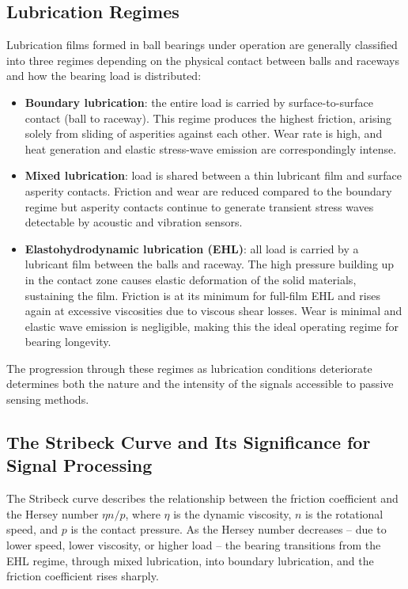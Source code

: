\subsection{Lubrication Regimes}
\label{subsec:lubrication_regimes}
Lubrication films formed in ball bearings under operation are generally classified into three regimes depending on the physical contact between balls and raceways and how the bearing load is distributed:
\begin{itemize}
    \item \textbf{Boundary lubrication}: the entire load is carried by surface-to-surface contact (ball to raceway). This regime produces the highest friction, arising solely from sliding of asperities against each other. Wear rate is high, and heat generation and elastic stress-wave emission are correspondingly intense.
    \item \textbf{Mixed lubrication}: load is shared between a thin lubricant film and surface asperity contacts. Friction and wear are reduced compared to the boundary regime but asperity contacts continue to generate transient stress waves detectable by acoustic and vibration sensors.
    \item \textbf{Elastohydrodynamic lubrication (EHL)}: all load is carried by a lubricant film between the balls and raceway. The high pressure building up in the contact zone causes elastic deformation of the solid materials, sustaining the film. Friction is at its minimum for full-film EHL and rises again at excessive viscosities due to viscous shear losses. Wear is minimal and elastic wave emission is negligible, making this the ideal operating regime for bearing longevity.
\end{itemize}
The progression through these regimes as lubrication conditions deteriorate determines both the nature and the intensity of the signals accessible to passive sensing methods.

\subsection{The Stribeck Curve and Its Significance for Signal Processing}
\label{subsec:stribeck}
 The Stribeck curve describes the relationship between the friction coefficient and the Hersey number $\eta n / p$, where $\eta$ is the dynamic viscosity, $n$ is the rotational speed, and $p$ is the contact pressure. As the Hersey number decreases -- due to lower speed, lower viscosity, or higher load -- the bearing transitions from the EHL regime, through mixed lubrication, into boundary lubrication, and the friction coefficient rises sharply.

